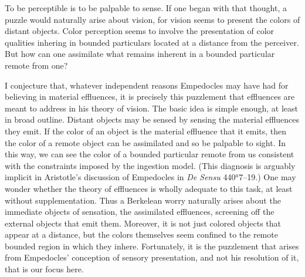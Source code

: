 \documentclass[12pt]{article}
\begin{document}
To be perceptible is to be palpable to sense. If one began with that thought, a puzzle would naturally arise about vision, for vision seems to present the colors of distant objects. Color perception seems to involve the presentation of color qualities inhering in bounded particulars located at a distance from the perceiver. But how can one assimilate what remains inherent in a bounded particular remote from one? 

I conjecture that, whatever independent reasons Empedocles may have had for believing in material effluences, it is precisely this puzzlement that effluences are meant to address in his theory of vision. The basic idea is simple enough, at least in broad outline. Distant objects may be sensed by sensing the material effluences they emit. If the color of an object is the material effluence that it emits, then the color of a remote object can be assimilated and so be palpable to sight. In this way, we can see the color of a bounded particular remote from us  consistent with the constraints imposed by the ingestion model. (This diagnosis is arguably implicit in Aristotle's discussion of Empedocles in \emph{De Sensu} 440\( ^{a} \)7--19.) One may wonder whether the theory of effluences is wholly adequate to this task, at least without supplementation. Thus a Berkelean worry naturally arises about the immediate objects of sensation, the assimilated effluences, screening off the external objects that emit them. Moreover, it is not just colored objects that appear at a distance, but the colors themselves seem confined to the remote bounded region in which they inhere. Fortunately, it is the puzzlement that arises from Empedocles' conception of sensory presentation, and not his resolution of it, that is our focus here. 
\end{document}

